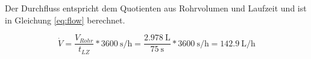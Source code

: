 Der Durchfluss entspricht dem Quotienten aus Rohrvolumen und Laufzeit und ist in Gleichung \ref{eq:flow} berechnet.

\begin{equation}
	\label{eq:flow}
	\dot V = \frac{V_{Rohr}}{t_{LZ}}*\SI{3600}{\second\per\hour} = \frac{\SI{2,978}{\liter}}{\SI{75}{\second}}*\SI{3600}{\second\per\hour} = \SI{142,9}{\liter\per\hour}
\end{equation}


